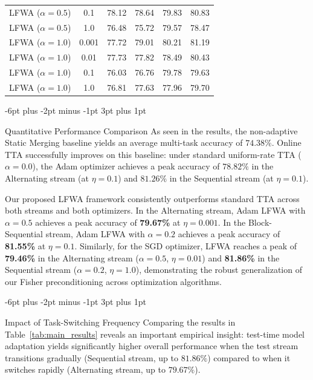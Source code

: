 \documentclass{article}
\makeatletter
\theoremstyle{plain}
\theoremstyle{definition}
\theoremstyle{remark}
\renewcommand{\subsection}{\@startsection{subsection}{2}{\z@}%
                          {-6pt plus -2pt minus -1pt}%
                          {3pt plus 1pt}%
                          {\normalfont\normalsize\bfseries\raggedright}}
\makeatother
\begin{document}
\begin{table}[t]
\begin{center}
\begin{small}
{\begin{tabular}{lccccc}
LFWA ($\alpha = 0.5$)         & 0.1   & 78.12 & 78.64 & 79.83 & 80.83 \\
LFWA ($\alpha = 0.5$)         & 1.0   & 76.48 & 75.72 & 79.57 & 78.47 \\
\midrule
LFWA ($\alpha = 1.0$)         & 0.001 & 77.72 & 79.01 & 80.21 & 81.19 \\
LFWA ($\alpha = 1.0$)         & 0.01  & 77.73 & 77.82 & 78.49 & 80.43 \\
LFWA ($\alpha = 1.0$)         & 0.1   & 76.03 & 76.76 & 79.78 & 79.63 \\
LFWA ($\alpha = 1.0$)         & 1.0   & 76.81 & 77.63 & 77.96 & 79.70 \\
\bottomrule
\end{tabular}%
}
\end{small}
\end{center}
\end{table}

\subsection{Quantitative Performance Comparison}
As seen in the results, the non-adaptive Static Merging baseline yields an average multi-task accuracy of $74.38\%$. Online TTA successfully improves on this baseline: under standard uniform-rate TTA ($\alpha=0.0$), the Adam optimizer achieves a peak accuracy of $78.82\%$ in the Alternating stream (at $\eta=0.1$) and $81.26\%$ in the Sequential stream (at $\eta=0.1$). 

Our proposed LFWA framework consistently outperforms standard TTA across both streams and both optimizers. In the Alternating stream, Adam LFWA with $\alpha=0.5$ achieves a peak accuracy of \textbf{79.67\%} at $\eta=0.001$. In the Block-Sequential stream, Adam LFWA with $\alpha=0.2$ achieves a peak accuracy of \textbf{81.55\%} at $\eta=0.1$. Similarly, for the SGD optimizer, LFWA reaches a peak of \textbf{79.46\%} in the Alternating stream ($\alpha=0.5$, $\eta=0.01$) and \textbf{81.86\%} in the Sequential stream ($\alpha=0.2$, $\eta=1.0$), demonstrating the robust generalization of our Fisher preconditioning across optimization algorithms.

\subsection{Impact of Task-Switching Frequency}
Comparing the results in Table~\ref{tab:main_results} reveals an important empirical insight: test-time model adaptation yields significantly higher overall performance when the test stream transitions gradually (Sequential stream, up to $81.86\%$) compared to when it switches rapidly (Alternating stream, up to $79.67\%$). 
\end{document}
